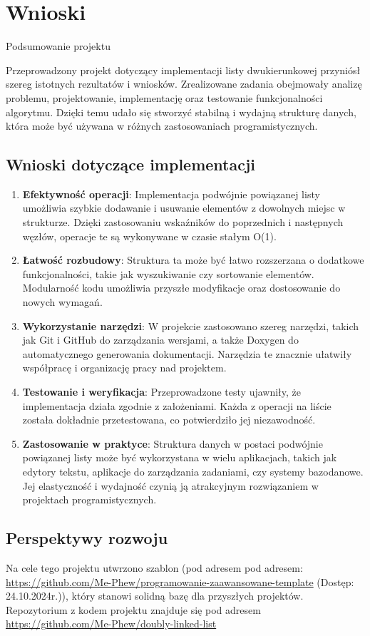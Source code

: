 \newpage
\section{Wnioski}	%

Podsumowanie projektu

Przeprowadzony projekt dotyczący implementacji listy dwukierunkowej przyniósł szereg istotnych rezultatów i wniosków. Zrealizowane zadania obejmowały analizę problemu, projektowanie, implementację oraz testowanie funkcjonalności algorytmu. Dzięki temu udało się stworzyć stabilną i wydajną strukturę danych, która może być używana w różnych zastosowaniach programistycznych.

\subsection{Wnioski dotyczące implementacji}

\begin{enumerate}
	\item \textbf{Efektywność operacji}: Implementacja podwójnie powiązanej listy umożliwia szybkie dodawanie i usuwanie elementów z dowolnych miejsc w strukturze. Dzięki zastosowaniu wskaźników do poprzednich i następnych węzłów, operacje te są wykonywane w czasie stałym O(1).
	\item \textbf{Łatwość rozbudowy}: Struktura ta może być łatwo rozszerzana o dodatkowe funkcjonalności, takie jak wyszukiwanie czy sortowanie elementów. Modularność kodu umożliwia przyszłe modyfikacje oraz dostosowanie do nowych wymagań.
	\item \textbf{Wykorzystanie narzędzi}: W projekcie zastosowano szereg narzędzi, takich jak Git i GitHub do zarządzania wersjami, a także Doxygen do automatycznego generowania dokumentacji. Narzędzia te znacznie ułatwiły współpracę i organizację pracy nad projektem.
	\item \textbf{Testowanie i weryfikacja}: Przeprowadzone testy ujawniły, że implementacja działa zgodnie z założeniami. Każda z operacji na liście została dokładnie przetestowana, co potwierdziło jej niezawodność.
	\item \textbf{Zastosowanie w praktyce}: Struktura danych w postaci podwójnie powiązanej listy może być wykorzystana w wielu aplikacjach, takich jak edytory tekstu, aplikacje do zarządzania zadaniami, czy systemy bazodanowe. Jej elastyczność i wydajność czynią ją atrakcyjnym rozwiązaniem w projektach programistycznych.
\end{enumerate}

\newpage

\subsection{Perspektywy rozwoju}

Na cele tego projektu utwrzono szablon (pod adresem pod adresem: \url{https://github.com/Me-Phew/programowanie-zaawansowane-template}\cite{GitHubProjectTemplate} (Dostęp: 24.10.2024r.)), który stanowi solidną bazę dla przyszłych projektów.
Repozytorium z kodem projektu znajduje się pod adresem \url{https://github.com/Me-Phew/doubly-linked-list}\cite{GitHubProject}
